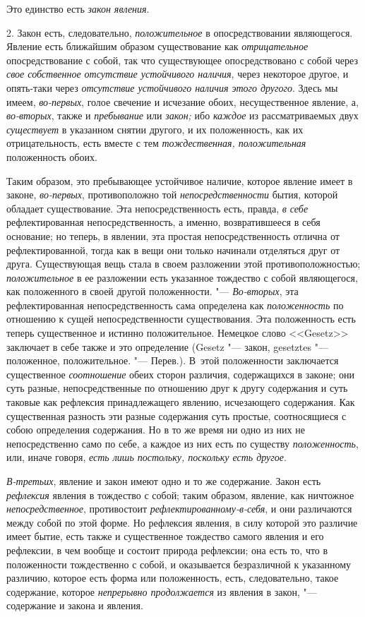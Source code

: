Это единство есть {\em закон явления}.

2. Закон есть, следовательно, {\em положительное} в
опосредствовании являющегося. Явление есть ближайшим образом существование
как {\em отрицательное} опосредствование с собой, так
что существующее опосредствовано с собой через
{\em свое собственное отсутствие устойчивого наличия},
через некоторое другое, и опять-таки через
{\em отсутствие устойчивого наличия этого другого}.
Здесь мы имеем, {\em во-первых}, голое свечение и
исчезание обоих, несущественное явление, а,
{\em во-вторых}, также и {\em пребывание} или {\em закон;}
ибо {\em каждое} из рассматриваемых двух
{\em существует} в указанном снятии другого, и их
положенность, как их отрицательность, есть вместе с тем
{\em тождественная, положительная} положенность обоих.

Таким образом, это пребывающее устойчивое наличие, которое явление имеет в
законе, {\em во-первых}, противоположно той
{\em непосредственности} бытия, которой обладает
существование. Эта непосредственность есть, правда,
{\em в себе} рефлектированная непосредственность, а
именно, возвратившееся в себя основание; но теперь, в явлении, эта простая
непосредственность отлична от рефлектированной, тогда как в вещи они только
начинали отделяться друг от друга. Существующая вещь стала в своем
разложении этой противоположностью; {\em положительное}
в ее разложении есть указанное тождество с собой являющегося, как
положенного в своей другой положенности. "---
{\em Во-вторых}, эта рефлектированная непосредственность сама определена как
{\em положенность} по отношению к сущей
непосредственности существования. Эта положенность есть теперь существенное
и истинно положительное. Немецкое слово <<Gesetz>> заключает в себе также и
это определение (Gesetz "--- закон, gesetztes "--- положенное,
положительное. "--- Перев.). В~этой положенности заключается существенное
{\em соотношение} обеих сторон различия, содержащихся в
законе; они суть разные, непосредственные по отношению друг к другу
содержания и суть таковые как рефлексия принадлежащего явлению, исчезающего
содержания. Как существенная разность эти разные содержания суть простые,
соотносящиеся с собою определения содержания. Но в то же время ни одно из
них не непосредственно само по себе, а каждое из них есть по существу
{\em положенность}, или, иначе говоря,
{\em есть лишь постольку, поскольку есть другое}.

{\em В-третьих}, явление и закон имеют одно и то же
содержание. Закон есть {\em рефлексия} явления в
тождество с собой; таким образом, явление, как ничтожное
{\em непосредственное}, противостоит
{\em рефлектированному-в-себя}, и они различаются между
собой по этой форме. Но рефлексия явления, в силу которой это различие
имеет бытие, есть также и существенное тождество самого явления и его
рефлексии, в чем вообще и состоит природа рефлексии; она есть то, что в
положенности тождественно с собой, и оказывается безразличной к указанному
различию, которое есть форма или положенность, есть, следовательно, такое
содержание, которое {\em непрерывно продолжается} из
явления в закон, "--- содержание и закона и явления.

